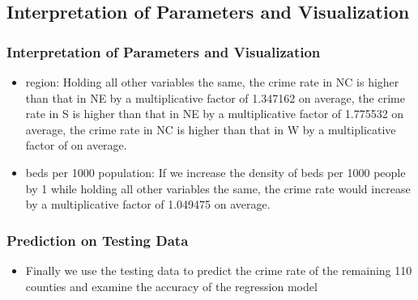 \documentclass{beamer}
\begin{document}
\subsection{Interpretation of Parameters and Visualization}
\begin{frame}[fragile]
\frametitle{Interpretation of Parameters and Visualization}
\begin{itemize}
\item region: Holding all other variables the same, the crime rate in NC is higher than that in NE by a multiplicative factor of 1.347162 on average, the crime rate in S is higher than that in NE by a multiplicative factor of 1.775532 on average, the crime rate in NC is higher than that in W by a multiplicative factor of  on average.\\
\item beds per 1000 population: If we increase the density of beds per 1000 people by 1 while holding all other variables the same, the crime rate would increase by a multiplicative factor of 1.049475 on average.
\end{itemize}
\end{frame}


\begin{frame}[fragile]
\frametitle{Prediction on Testing Data}
\begin{itemize}
\item Finally we use the testing data to predict the crime rate of the remaining 110 counties and examine the accuracy of the regression model
\end{itemize}
\begin{center}
\end{center}
\end{frame}
\end{document}
